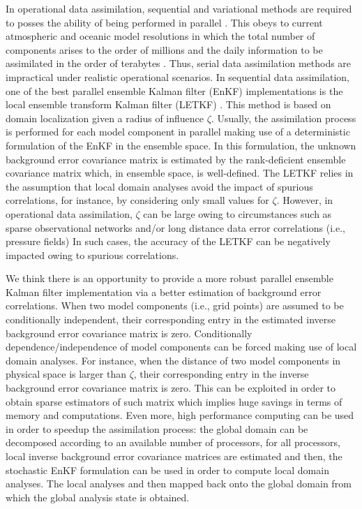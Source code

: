 \documentclass[12pt]{article}
\newcommand{\ra}{\zeta}
\begin{document}
In operational data assimilation, sequential and variational methods are required to posses the ability of being performed in parallel \cite{nerger2013software,rao2016time,liu2012advancing}. This obeys to current atmospheric and oceanic model resolutions in which the total number of components arises to the order of millions and the daily information to be assimilated in the order of terabytes \cite{DAIssues,emerick2013ensemble}. Thus, serial data assimilation methods are impractical under realistic operational scenarios. In sequential data assimilation, one of the best parallel ensemble Kalman filter (EnKF) implementations is the local ensemble transform Kalman filter (LETKF) \cite{TELA:TELA076}. This method is based on domain localization given a radius of influence $\ra$. Usually, the assimilation process is performed for each model component in parallel making use of a deterministic formulation of the EnKF in the ensemble space. In this formulation, the unknown background error covariance matrix is estimated by the rank-deficient ensemble covariance matrix which, in ensemble space, is well-defined. The LETKF relies in the assumption that local domain analyses avoid the impact of spurious correlations, for instance, by considering only small values for $\ra$. However, in operational data assimilation, $\ra$ can be large owing to circumstances such as sparse observational networks and/or long distance data error correlations (i.e., pressure fields) In such cases, the accuracy of the LETKF can be negatively impacted owing to spurious correlations. 

We think there is an opportunity to provide a more robust parallel ensemble Kalman filter implementation via a better estimation of background error correlations. When two model components (i.e., grid points) are assumed to be conditionally independent, their corresponding entry in the estimated inverse background error covariance matrix is zero. Conditionally dependence/independence of model components can be forced making use of local domain analyses. For instance, when the distance of two model components in physical space is larger than $\ra$, their corresponding entry in the inverse background error covariance matrix is zero. This can be exploited in order to obtain sparse estimators of such matrix which implies huge savings in terms of memory and computations. Even more, high performance computing can be used in order to speedup the assimilation process: the global domain can be decomposed according to an available number of processors, for all processors, local inverse background error covariance matrices are estimated and then,  the stochastic EnKF formulation \cite{EnKFEvensen} can be used in order to compute local domain analyses. The local analyses and then mapped back onto the global domain from which the global analysis state is obtained.
\end{document}
